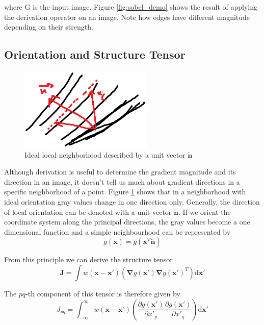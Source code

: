 		where G is the input image. Figure \ref{fig:sobel_demo} shows the result of applying the derivation operator on an image. Note how edges have different magnitude depending on their strength. 
		
		
		\subsection{Orientation and Structure Tensor}
		\begin{figure} %
			\centering
			\includegraphics[scale=1]{images/structure_tensor_intro.png}
			\caption{Ideal local neighborhood described by a unit vector $\tilde{\mathbf{n}}$}
			\label{fig:struct_tensor_intro}
		\end{figure}
		Although derivation is useful to determine the gradient magnitude and its direction in an image, it doesn't tell us much about gradient directions in a specific neighborhood of a point. Figure \ref{fig:struct_tensor_intro} shows that in a neighborhood with ideal orientation gray values change in one direction only. Generally, the direction of local orientation can be denoted with a unit vector $\tilde{\mathbf{n}}$. If we orient the coordinate system along the principal directions, the gray values become a one dimensional function and a simple neighbourhood can be represented by
		\begin{equation}
			g(\mathbf{x}) = g(\mathbf{x}^T \tilde{\mathbf{n}})
		\end{equation}

		From this principle we can derive the structure tensor \citep{JaehneBook}
		\begin{equation} 
			\mathbf{J} = \int w(\mathbf{x} - \mathbf{x'}) 
								\left( 
									\mathbf{\nabla}g(\mathbf{x'}) \mathbf{\nabla}g(\mathbf{x'})^T
								\right)
								\text{d}\mathbf{x'}
		\end{equation}
		
		The $pq$-th component of this tensor is therefore given by
		\begin{equation}
			J_{pq} = \int_{-\infty}^{\infty} w(\mathbf{x} - \mathbf{x'}) 
							\left(
								\dfrac{\partial g(\mathbf{x'})}{\partial x'_p} \dfrac{\partial g(\mathbf{x'})}{\partial x'_q}
							\right)
							\text{d} \mathbf{x'}
			\label{eq:struct_tensor_pq}
		\end{equation}
		
